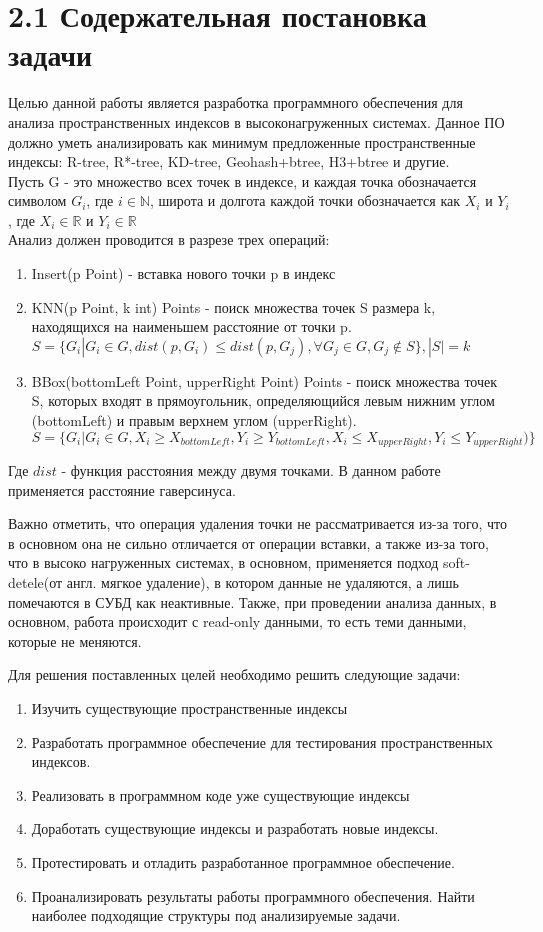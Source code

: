 \label{cha:statement}

\section{2.1 Содержательная постановка задачи}

Целью данной работы является разработка программного обеспечения для анализа пространственных индексов в высоконагруженных системах. Данное ПО должно уметь анализировать как минимум предложенные пространственные индексы: R-tree, R*-tree, KD-tree, Geohash+btree, H3+btree и другие.\\
Пусть G - это множество всех точек в индексе, и каждая точка обозначается символом $G_i$, где $i \in \mathbb{N}$, широта и долгота каждой точки обозначается как $X_i$ и $Y_i$, где $X_i \in \mathbb{R}$ и $Y_i \in \mathbb{R}$\\
Анализ должен проводится в разрезе трех операций:
\begin{enumerate}
    \item  Insert(p Point) - вставка нового точки p в индекс
    \item  KNN(p Point, k int) Points -  поиск множества точек S размера k, находящихся на наименьшем расстояние от точки p. $S=\{G_i | G_i \in G, dist(p, G_i) \leq dist(p, G_j),  \forall G_j \in G, G_j \notin S \}, |S| = k$
    \item  BBox(bottomLeft Point, upperRight Point) Points - поиск множества точек S, которых входят в прямоугольник, определяющийся левым нижним углом (bottomLeft) и правым верхнем углом (upperRight). $S=\{G_i | G_i \in G, X_i \geq X_{bottomLeft}, Y_i \geq Y_{bottomLeft}, X_i \leq X_{upperRight}, Y_i \leq Y_{upperRight} )\}$
\end{enumerate}
Где $dist$ - функция расстояния между двумя точками. В данном работе применяется расстояние гаверсинуса. 

Важно отметить, что операция удаления точки не рассматривается из-за того, что в основном она не сильно отличается от операции вставки, а также из-за того, что в высоко нагруженных системах, в основном, применяется подход soft-detele(от англ. мягкое удаление), в котором данные не удаляются, а лишь помечаются в СУБД как неактивные. Также, при проведении анализа данных, в основном, работа происходит с read-only данными, то есть теми данными, которые не меняются. 

Для решения поставленных целей необходимо решить следующие задачи:
\begin{enumerate}
    \item Изучить существующие пространственные индексы
    \item Разработать программное обеспечение для тестирования пространственных индексов.
    \item Реализовать в программном коде уже существующие индексы
    \item Доработать существующие индексы и разработать новые индексы. 
    \item Протестировать и отладить разработанное программное обеспечение.
    \item Проанализировать результаты работы программного обеспечения. Найти наиболее подходящие структуры под анализируемые задачи.
\end{enumerate}
